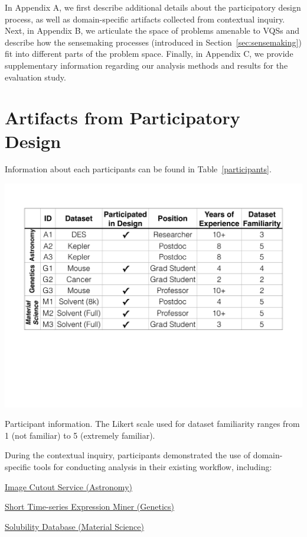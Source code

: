 \onecolumn
 \appendix
 \npar In Appendix A, we first describe additional details about the participatory design process, as well as domain-specific artifacts collected from contextual inquiry. Next, in Appendix B, we articulate the space of problems amenable to VQSs and describe how the sensemaking processes (introduced in Section~\ref{sec:sensemaking}) fit into different parts of the problem space. Finally, in Appendix C, we provide supplementary information regarding our analysis methods and results for the evaluation study.
 \section{Artifacts from Participatory Design\label{apdx:pdartifact}}
 \npar Information about each participants can be found in Table~\ref{participants}. 
  \begin{table}[h!]
  \captionsetup{font=normalsize,labelfont=normalsize}
    \centering
    \includegraphics[width=0.5\linewidth]{figures/participant_info.pdf}
    \caption{Participant information. The Likert scale used for dataset familiarity ranges from 1 (not familiar) to 5 (extremely familiar).}
    \label{participants}
  \end{table}
 \npar During the contextual inquiry, participants demonstrated the use of domain-specific tools for conducting analysis in their existing workflow, including:
   \begin{denselist}
     \item \href{http://descut.cosmology.illinois.edu}{Image Cutout Service (Astronomy)}
     \item \href{http://cs.cmu.edu/~jernst/stem/}{Short Time-series Expression Miner (Genetics)}
     \item \href{http://srdata.nist.gov/solubility/}{Solubility Database (Material Science)}
   \end{denselist}
